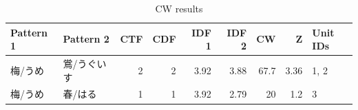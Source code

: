 \begin{table}[htbp]
\centering
\caption{CW results}
\label{tab:cw-results}
\begin{tabular}{llrrrrrrl}
\hline
Pattern 1 & Pattern 2 & CTF & CDF & IDF 1 & IDF 2 & CW & Z & Unit IDs \\
\hline
梅/うめ & 鴬/うぐいす & 2 & 2 & 3.92 & 3.88 & 67.7 & 3.36 & 1, 2 \\
梅/うめ & 春/はる & 1 & 1 & 3.92 & 2.79 & 20 & 1.2 & 3 \\
\hline
\end{tabular}
\end{table}
